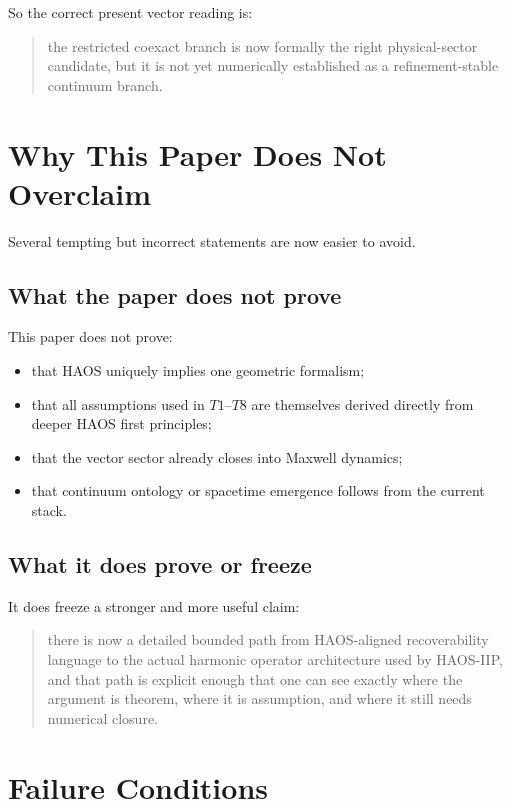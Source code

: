 \documentclass[11pt]{article}
\begin{document}
So the correct present vector reading is:
\begin{quote}
the restricted coexact branch is now formally the right physical-sector candidate, but it is not yet numerically established as a refinement-stable continuum branch.
\end{quote}

\section{Why This Paper Does Not Overclaim}

Several tempting but incorrect statements are now easier to avoid.

\subsection{What the paper does not prove}

This paper does not prove:
\begin{itemize}
\item that HAOS uniquely implies one geometric formalism;
\item that all assumptions used in $T1$--$T8$ are themselves derived directly from deeper HAOS first principles;
\item that the vector sector already closes into Maxwell dynamics;
\item that continuum ontology or spacetime emergence follows from the current stack.
\end{itemize}

\subsection{What it does prove or freeze}

It does freeze a stronger and more useful claim:
\begin{quote}
there is now a detailed bounded path from HAOS-aligned recoverability language to the actual harmonic operator architecture used by HAOS-IIP, and that path is explicit enough that one can see exactly where the argument is theorem, where it is assumption, and where it still needs numerical closure.
\end{quote}

\section{Failure Conditions}
\end{document}
